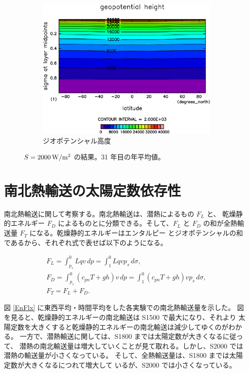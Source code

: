 \documentclass[body]{subfiles}
\begin{document}
\begin{figure}[t]
\begin{subfigure}{.4\textwidth}
		\includegraphics[width=\columnwidth]{S2000/Height,time=7300:7665-crop-rotate.pdf}
		\caption{ジオポテンシャル高度}
	\end{subfigure}
	\caption{
		\(S=2000\hmu{W/m^2}\) の結果。31 年目の年平均値。
	}\label{S2000}
\end{figure}

\section{南北熱輸送の太陽定数依存性}

南北熱輸送に関して考察する。南北熱輸送は、潜熱によるもの \(F_L\) と、
乾燥静的エネルギー \(F_D\) によるものとに分類できる。そして、\(F_L\) と
\(F_D\) の和が全熱輸送量 \(F_T\) になる。乾燥静的エネルギーはエンタルピー
とジオポテンシャルの和であるから、それぞれ式で表せば以下のようになる。

\begin{gather}
	F_L=\int_{p_s}^0 Lqv\,dp=\int_1^0 Lqvp_s\,d\sigma,\\
	F_D=\int_{p_s}^0 (c_{pn}T+gh)v\,dp=\int_1^0 (c_{pn}T+gh)vp_s\,d\sigma,\\
	F_T=F_L+F_D.
\end{gather}

図 \ref{EnFlx} に東西平均・時間平均をした各実験での南北熱輸送量を示した。
図を見ると、乾燥静的エネルギーの南北輸送は S1500 で最大になり、それより
太陽定数を大きくすると乾燥静的エネルギーの南北輸送は減少してゆくのがわかる。
一方で、潜熱輸送に関しては、S1800 までは太陽定数が大きくなるに従って、
潜熱の南北輸送量は増大していくことが見て取れる。しかし、S2000 では
潜熱の輸送量が小さくなっている。
そして、全熱輸送量は、S1800 までは太陽定数が大きくなるにつれて増大して
いるが、S2000 では小さくなっている。
\end{document}
